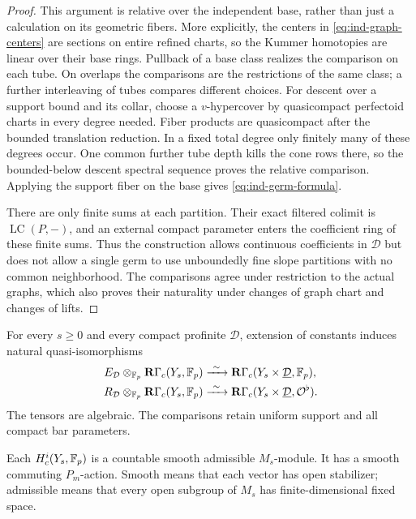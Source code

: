 \begin{proof}
This argument is relative over the independent base, rather
than just a calculation on its geometric fibers.  More
explicitly, the centers in \cref{eq:ind-graph-centers} are
sections on entire refined charts, so the Kummer homotopies are
linear over their base rings.  Pullback of a base class realizes
the comparison on each tube.  On overlaps the comparisons are
the restrictions of the same class; a further interleaving of
tubes compares different choices.  For descent over a support
bound and its collar, choose a $v$-hypercover by quasicompact
perfectoid charts in every degree needed.  Fiber products are
quasicompact after the bounded translation reduction.  In a
fixed total degree only finitely many of these degrees occur.
One common further tube depth kills the cone rows there, so the
bounded-below descent spectral sequence proves the relative
comparison.  Applying the support fiber on the base gives
\cref{eq:ind-germ-formula}.

There are only finite sums at each partition.  Their exact
filtered colimit is $\operatorname{LC}(P,-)$, and an external
compact parameter enters the coefficient ring of these finite
sums.  Thus the construction allows continuous coefficients in
$\mathcal D$ but does not allow a single germ to use
unboundedly fine slope partitions with no common neighborhood.
The comparisons agree under restriction to the actual graphs,
which also proves their naturality under changes of graph
chart and changes of lifts.
\end{proof}

\begin{theorem}
\label{thm:ind-comparison}
For every $s\geq0$ and every compact profinite $\mathcal D$,
extension of constants induces natural quasi-isomorphisms
\begin{align}
 E_{\mathcal D}\otimes_{\mathbb F_p}\mathbf R\Gamma_c(Y_s,\mathbb F_p)
   &\xrightarrow{\ \sim\ }
       \mathbf R\Gamma_c(Y_s\times\underline{\mathcal D},\mathbb F_p),
       \label{eq:ind-fp-parameters}\\
 R_{\mathcal D}\otimes_{\mathbb F_p}\mathbf R\Gamma_c(Y_s,\mathbb F_p)
   &\xrightarrow{\ \sim\ }
       \mathbf R\Gamma_c(Y_s\times\underline{\mathcal D},\mathcal O^\flat).
       \label{eq:ind-algebraic-comparison}
\end{align}
The tensors are algebraic.  The comparisons retain uniform
support and all compact bar parameters.

Each $H_c^i(Y_s,\mathbb F_p)$ is a countable smooth admissible
$M_s$-module.  It has a smooth commuting $P_m$-action.  Smooth
means that each vector has open stabilizer; admissible means
that every open subgroup of $M_s$ has finite-dimensional fixed
space.
\end{theorem}

